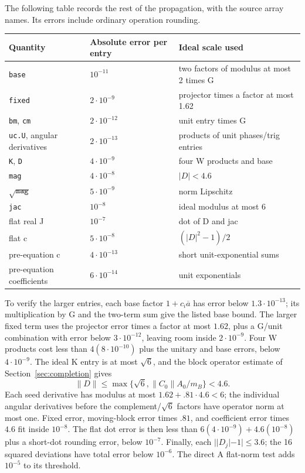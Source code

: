 The following table records the rest of the propagation, with the
source array names.  Its errors include ordinary operation rounding.
\begin{center}
\small
\begin{tabular}{>{\raggedright\arraybackslash}p{.22\linewidth}p{.23\linewidth}p{.45\linewidth}}
\hline
Quantity & Absolute error per entry & Ideal scale used\\
\hline
\texttt{base} & $10^{-11}$ & two factors of modulus at most 2 times G\\
\texttt{fixed} & $2\cdot10^{-9}$ & projector times a factor at most 1.62\\
\texttt{bm}, \texttt{cm} & $2\cdot10^{-12}$ & unit entry times G\\
\texttt{uc.U}, angular derivatives & $2\cdot10^{-13}$ & products of unit phases/trig entries\\
\texttt{K}, \texttt{D} & $4\cdot10^{-9}$ & four W products and base\\
\texttt{mag} & $4\cdot10^{-8}$ & $|D|<4.6$\\
$\sqrt{\texttt{mag}}$ & $5\cdot10^{-9}$ & norm Lipschitz\\
\texttt{jac} & $10^{-8}$ & ideal modulus at most 6\\
flat real J & $10^{-7}$ & dot of D and jac\\
flat c & $5\cdot10^{-8}$ & $(|D|^2-1)/2$\\
pre-equation c & $4\cdot10^{-13}$ & short unit-exponential sums\\
pre-equation coefficients & $6\cdot10^{-14}$ & unit exponentials\\
\hline
\end{tabular}
\end{center}
To verify the larger entries, each base factor $1+c_i\overline a$ has
error below $1.3\cdot10^{-13}$; its multiplication by G and the
two-term sum give the listed base bound.  The larger fixed term uses
the projector error times a factor at most $1.62$, plus a G/unit
combination with error below $3\cdot10^{-12}$, leaving room inside
$2\cdot10^{-9}$.  Four W products cost less than
$4(8\cdot10^{-10})$ plus the unitary and base errors, below
$4\cdot10^{-9}$.  The ideal K entry is at most $\sqrt6$, and the block
operator estimate of Section~\ref{sec:completion} gives
\[
 \|D\|\le\max\{\sqrt6,\|C_0\|A_0/m_B\}<4.6.
\]
Each seed derivative has modulus at most $1.62+.81\cdot4.6<6$;
the individual angular derivatives before the complement/$\sqrt6$
factors have operator norm at most one.  Fixed error, moving-block
error times $.81$, and coefficient error times $4.6$ fit inside
$10^{-8}$.  The flat dot error is then less than
$6(4\cdot10^{-9})+4.6(10^{-8})$ plus a short-dot rounding error,
below $10^{-7}$.  Finally, each $||D_j|-1|\le3.6$; the 16 squared
deviations have total error below $10^{-6}$.  The direct A flat-norm
test adds $10^{-5}$ to its threshold.

